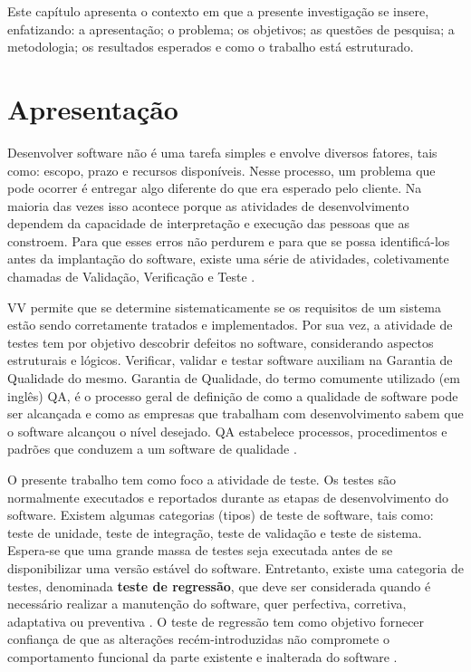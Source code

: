
\acresetall 
Este capítulo apresenta o contexto em que a presente investigação se insere, enfatizando: a apresentação; o problema; os objetivos; as questões de pesquisa; a metodologia; os resultados esperados e como o trabalho está estruturado.

\section{Apresentação}\label{sec:apresentacao}
Desenvolver software não é uma tarefa simples e envolve diversos fatores, tais como: escopo, prazo e recursos disponíveis. Nesse processo, um problema que pode ocorrer é entregar algo diferente do que era esperado pelo cliente. Na maioria das vezes isso acontece porque as atividades de desenvolvimento dependem da capacidade de interpretação e execução das pessoas que as constroem. Para que esses erros não perdurem e para que se possa identificá-los antes da implantação do software, existe uma série de atividades, coletivamente chamadas de Validação, Verificação e Teste \cite{DELAMARO2007}. 

\ac{VV} permite que se determine sistematicamente se os requisitos de um sistema estão sendo corretamente tratados e implementados. Por sua vez, a atividade de testes tem por objetivo descobrir defeitos no software, considerando aspectos estruturais e lógicos. Verificar, validar e testar software auxiliam na Garantia de Qualidade do mesmo. Garantia de Qualidade, do termo comumente utilizado (em inglês) \ac{QA}, é o processo geral de definição de como a qualidade de software pode ser alcançada e como as empresas que trabalham com desenvolvimento sabem que o software alcançou o nível desejado. \ac{QA} estabelece processos, procedimentos e padrões que conduzem a um software de qualidade \cite{HIRAMA2011}. 

O presente trabalho tem como foco a atividade de teste. Os testes são normalmente executados e reportados durante as etapas de desenvolvimento do software. Existem algumas categorias (tipos) de teste de software, tais como: teste de unidade, teste de integração, teste de validação e teste de sistema. Espera-se que uma grande massa de testes seja executada antes de se disponibilizar uma versão estável do software. Entretanto, existe uma categoria de testes, denominada \textbf{teste de regressão}, que deve ser considerada quando é necessário realizar a manutenção do software, quer perfectiva, corretiva, adaptativa ou preventiva \cite{DBLP:series/springer/Mens08}. O teste de regressão tem como objetivo fornecer confiança de que as alterações recém-introduzidas não compromete o comportamento funcional da parte existente e inalterada do software \cite{Yoo:2012:RTM:2284811.2284813}.


